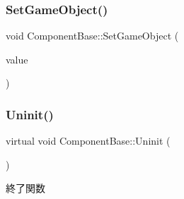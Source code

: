\subsubsection{\texorpdfstring{Set\+Game\+Object()}{SetGameObject()}}
{\footnotesize\ttfamily void Component\+Base\+::\+Set\+Game\+Object (\begin{DoxyParamCaption}\item[{\mbox{\hyperlink{class_game_object_base}{Game\+Object\+Base}} $\ast$}]{value }\end{DoxyParamCaption})\hspace{0.3cm}{\ttfamily [inline]}}

\mbox{\label{class_component_base_a9f42beaf0383d6f629819579cab4de57}} 
\subsubsection{\texorpdfstring{Uninit()}{Uninit()}}
{\footnotesize\ttfamily virtual void Component\+Base\+::\+Uninit (\begin{DoxyParamCaption}{ }\end{DoxyParamCaption})\hspace{0.3cm}{\ttfamily [pure virtual]}}



終了関数 



